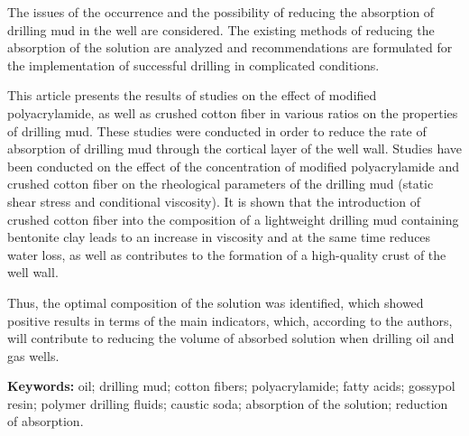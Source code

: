 The issues of the occurrence and the possibility of reducing the
absorption of drilling mud in the well are considered. The existing
methods of reducing the absorption of the solution are analyzed and
recommendations are formulated for the implementation of successful
drilling in complicated conditions.

This article presents the results of studies on the effect of modified
polyacrylamide, as well as crushed cotton fiber in various ratios on the
properties of drilling mud. These studies were conducted in order to
reduce the rate of absorption of drilling mud through the cortical layer
of the well wall. Studies have been conducted on the effect of the
concentration of modified polyacrylamide and crushed cotton fiber on the
rheological parameters of the drilling mud (static shear stress and
conditional viscosity). It is shown that the introduction of crushed
cotton fiber into the composition of a lightweight drilling mud
containing bentonite clay leads to an increase in viscosity and at the
same time reduces water loss, as well as contributes to the formation of
a high-quality crust of the well wall.

Thus, the optimal composition of the solution was identified, which
showed positive results in terms of the main indicators, which,
according to the authors, will contribute to reducing the volume of
absorbed solution when drilling oil and gas wells.

{\bfseries Keywords:} oil; drilling mud; cotton fibers;
polyacrylamide; fatty acids; gossypol resin; polymer drilling fluids;
caustic soda; absorption of the solution; reduction of absorption.

